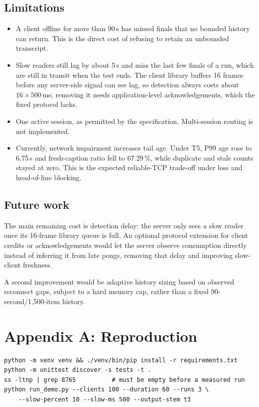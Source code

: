 \documentclass[11pt,a4paper]{article}
\begin{document}
\subsection{Limitations}

\begin{itemize}
\item A client offline for more than 90\,s has missed
      finals that no bounded history can return. This is the direct
      cost of refusing to retain an unbounded transcript.
\item Slow readers still lag by about 5\,s and miss the last few finals of a
      run, which are still in transit when the test ends. The client library
      buffers 16 frames before any server-side signal can see lag, so
      detection always costs about $16\times500$\,ms; removing it needs
      application-level acknowledgements, which the fixed protocol lacks.
\item One active session, as permitted by the
      specification. Multi-session routing is not implemented.
\item Currently, network impairment increases tail age. Under T5, P99 age
      rose to 6.75\,s and fresh-caption ratio fell to 67.29\,\%, while
      duplicate and stale counts stayed at zero. This is the expected
      reliable-TCP trade-off under loss and head-of-line blocking.
\end{itemize}


\subsection{Future work}
The main remaining cost is detection delay: the server only sees a slow
reader once its 16-frame library queue is full. An optional protocol
extension for client credits or acknowledgements would let the server
observe consumption directly instead of inferring it from late pongs,
removing that delay and improving slow-client freshness.

A second improvement would be adaptive history sizing based on observed
reconnect gaps, subject to a hard memory cap, rather than a fixed
90-second/1,500-item history.

\newpage
\section*{Appendix A: Reproduction}

\begin{verbatim}
python -m venv venv && ./venv/bin/pip install -r requirements.txt
python -m unittest discover -s tests -t .
ss -ltnp | grep 8765          # must be empty before a measured run
python run_demo.py --clients 100 --duration 60 --runs 3 \
    --slow-percent 10 --slow-ms 500 --output-stem t3
\end{verbatim}
\end{document}
